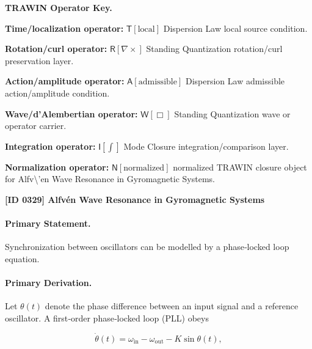 \par\vspace{0.45\baselineskip}
\noindent\begin{minipage}[t]{\linewidth}
\begingroup
\small
\raggedright
\textbf{TRAWIN Operator Key.}\par
\noindent\textbf{Time/localization operator:} $\mathsf{T}\!\left[\mathrm{local}\right]$ Dispersion Law local source condition.\par
\noindent\textbf{Rotation/curl operator:} $\mathsf{R}\!\left[\nabla\times\right]$ Standing Quantization rotation/curl preservation layer.\par
\noindent\textbf{Action/amplitude operator:} $\mathsf{A}\!\left[\mathrm{admissible}\right]$ Dispersion Law admissible action/amplitude condition.\par
\noindent\textbf{Wave/d'Alembertian operator:} $\mathsf{W}\!\left[\Box\right]$ Standing Quantization wave or operator carrier.\par
\noindent\textbf{Integration operator:} $\mathsf{I}\!\left[\int\right]$ Mode Closure integration/comparison layer.\par
\noindent\textbf{Normalization operator:} $\mathsf{N}\!\left[\mathrm{normalized}\right]$ normalized TRAWIN closure object for Alfv\textbackslash{}'en Wave Resonance in Gyromagnetic Systems.\par
\endgroup
\end{minipage}

\clearpage
\noindent\textbf{[ID 0329] Alfv\'en Wave Resonance in Gyromagnetic Systems}\par
\vspace{0.35em}
\paragraph{Primary Statement.}

Synchronization between oscillators can be modelled by a phase‑locked loop equation.

\paragraph{Primary Derivation.}

Let $\theta(t)$ denote the phase difference between an input signal and a reference oscillator.  A first‑order phase‑locked loop (PLL) obeys

\begin{equation}
\dot{\theta}(t) = \omega_{\mathrm{in}} - \omega_{\mathrm{out}} - K\sin\theta(t),
\end{equation}

